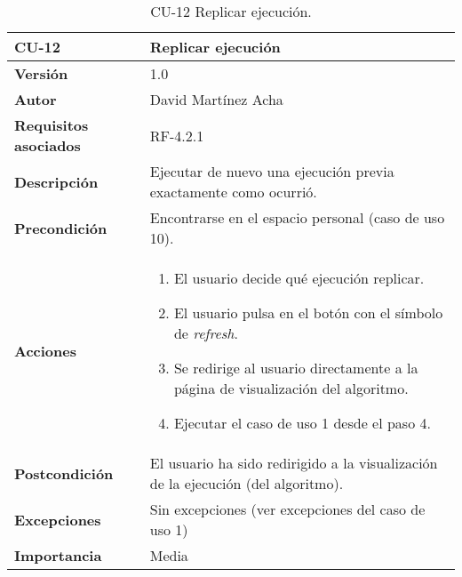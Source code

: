 \begin{table}[p]
	\centering
	\begin{tabularx}{\linewidth}{ p{} p{} }
		\toprule
		\textbf{CU-12}    & \textbf{Replicar ejecución}\\
		\toprule
		\textbf{Versión}              & 1.0    \\
		\textbf{Autor}                & David Martínez Acha \\
		\textbf{Requisitos asociados} & RF-4.2.1 \\
		\textbf{Descripción}          & Ejecutar de nuevo una ejecución previa exactamente como ocurrió. \\
		\textbf{Precondición}         & Encontrarse en el espacio personal (caso de uso 10). \\
		\textbf{Acciones}             &
		\begin{enumerate}
			\def\labelenumi{\arabic{enumi}.}
			\tightlist
			\item El usuario decide qué ejecución replicar.
			\item El usuario pulsa en el botón con el símbolo de \textit{refresh}.
			\item Se redirige al usuario directamente a la página de visualización del algoritmo.
			\item Ejecutar el caso de uso 1 desde el paso 4.
		\end{enumerate}\\
		\textbf{Postcondición}        & El usuario ha sido redirigido a la visualización de la ejecución (del algoritmo). \\
		\textbf{Excepciones}          & Sin excepciones (ver excepciones del caso de uso 1)\\
		\textbf{Importancia}          & Media \\
		\bottomrule
	\end{tabularx}
	\caption{CU-12 Replicar ejecución.}
\end{table}

